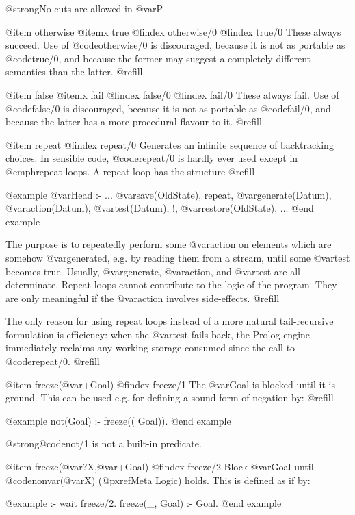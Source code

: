 @strong{No cuts are allowed in @var{P}.}

@item otherwise
@itemx true
@findex otherwise/0
@findex true/0
These always succeed.  Use of @code{otherwise/0} is discouraged, because it
is not as portable as @code{true/0}, and because the former may suggest
a completely different semantics than the latter. @refill

@item false
@itemx fail
@findex false/0
@findex fail/0
These always fail.  Use of @code{false/0} is discouraged, because it is
not as portable as @code{fail/0}, and because the latter has a more
procedural flavour to it. @refill

@item repeat
@findex repeat/0
Generates an infinite sequence of backtracking choices.  In sensible code,
@code{repeat/0} is hardly ever used except in @emph{repeat loops}.  A
repeat loop has the structure @refill

@example
@var{Head} :-
        ...
        @var{save}(OldState),
        repeat,
          @var{generate}(Datum),
          @var{action}(Datum),
          @var{test}(Datum),
        !,
        @var{restore}(OldState),
        ...
@end example

The purpose is to repeatedly perform some @var{action} on elements which
are somehow @var{generate}d, e.g. by reading them from a stream, until
some @var{test} becomes true.  Usually, @var{generate}, @var{action},
and @var{test} are all determinate.  Repeat loops cannot contribute to
the logic of the program.  They are only meaningful if the @var{action}
involves side-effects. @refill

The only reason for using repeat loops instead of a more natural
tail-recursive formulation is efficiency: when the @var{test} fails back,
the Prolog engine immediately reclaims any working storage consumed since
the call to @code{repeat/0}. @refill


@item freeze(@var{+Goal})
@findex freeze/1
The @var{Goal} is blocked until it is ground.  This can be used e.g. for
defining a sound form of negation by: @refill

@example
not(Goal) :- freeze((\+ Goal)).
@end example

@strong{@code{not/1} is not a built-in predicate.}

@item freeze(@var{?X},@var{+Goal})
@findex freeze/2
Block @var{Goal} until @code{nonvar(@var{X})} (@pxref{Meta Logic})
holds.  This is defined as if by:

@example
:- wait freeze/2.
freeze(_, Goal) :- Goal.
@end example

